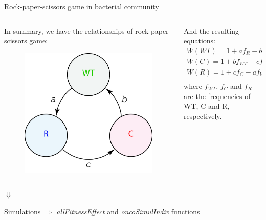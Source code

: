\begin{frame}{Rock-paper-scissors game in bacterial community}
	\begin{columns}
		\begin{column}{0.5\textwidth}
			\begin{center}
				In summary, we have the relationships of rock-paper-scissors game:
			\end{center}
			\begin{figure}
				\includegraphics[scale=0.12]{img/figure_rock-scissor-paper.jpg}			
			\end{figure}
		\end{column}
		\begin{column}{0.5\textwidth}
			\begin{center}
				And the resulting equations:
			\begin{align*}
				W\left(WT\right) = 1 + af_R - bf_C\\
				W\left(C\right) = 1 + bf_{WT} - cf_R\\
				W\left(R\right) = 1 + cf_C - af_{WT}\\
			\end{align*}
			where $f_{WT}$, $f_C$ and $f_R$ are the frequencies of WT, C and R, respectively. 
			\end{center}
		\end{column}
	\end{columns}
	\pause
	\begin{center}
		{\LARGE $\Downarrow$\\}
		\begin{block}
			{\centering
				Simulations $\Longrightarrow$ \textit{allFitnessEffect} and \textit{oncoSimulIndiv} functions
			}
		\end{block}
	\end{center}	
\end{frame}


